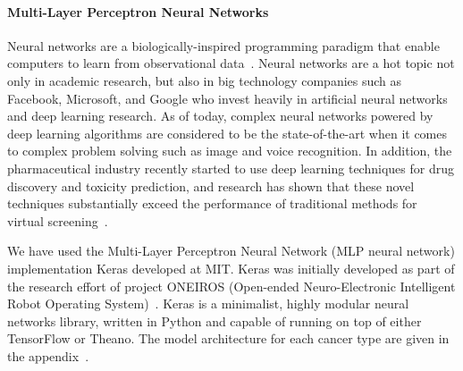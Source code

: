 \documentclass[10pt,letterpaper]{article}
\begin{document}


\paragraph{Multi-Layer Perceptron Neural Networks}
Neural networks are a biologically-inspired programming paradigm that enable computers to learn from observational data~\cite{deeplearning}.
 Neural networks are a hot topic not only in academic research, but also in big technology companies such as Facebook, Microsoft, and Google who invest heavily in artificial neural networks and deep learning research. As of today, complex neural networks powered by deep learning algorithms are considered to be the state-of-the-art when it comes to complex problem solving such as image and voice recognition.
In addition, the pharmaceutical industry recently started to use deep learning techniques for drug discovery and toxicity prediction, and research has shown that these novel techniques substantially exceed the performance of traditional methods for virtual screening~\cite{toxicity}.

We have used the Multi-Layer Perceptron Neural Network (MLP neural network) implementation Keras developed at MIT.
Keras was initially developed as part of the research effort of project ONEIROS (Open-ended Neuro-Electronic Intelligent Robot Operating System)~\cite{keras}.
Keras is a minimalist, highly modular neural networks library, written in Python and capable of running on top of either TensorFlow or Theano. The model architecture for each cancer type are given in the appendix~.
\end{document}
